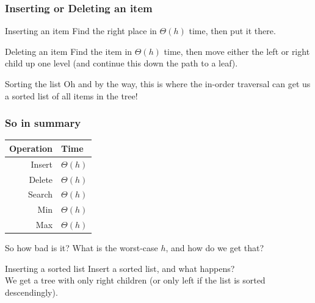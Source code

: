 \begin{frame}
	\frametitle{Inserting or Deleting an item}

	\begin{block}{Inserting an item}
		Find the right place in $\Theta(h)$ time, then put it there.
	\end{block}	

	
	\begin{block}{Deleting an item}
		Find the item in $\Theta(h)$ time, then move either the left or right child up one level (and continue this down the
		path to a leaf).
	\end{block}	
	
		\begin{block}{Sorting the list}
			Oh and by the way, this is where the in-order traversal can get us a sorted list of all items in the tree!
		\end{block}	
\end{frame}


\begin{frame}
	\frametitle{So in summary}
	\begin{tabular}{r | l}
		Operation & Time \\
		\midrule
		Insert & $\Theta(h)$ \\
		Delete & $\Theta(h)$ \\
		Search & $\Theta(h)$ \\
		Min & $\Theta(h)$ \\
		Max & $\Theta(h)$ \\
	\end{tabular}
		
	\begin{block}{So how bad is it?}
		What is the worst-case $h$, and how do we get that?
	\end{block}
	
	\begin{block}{Inserting a sorted list}
		Insert a sorted list, and what happens? \\
		 
		We get a tree with only right children (or only left if the list is sorted descendingly).
	\end{block}
	
\end{frame}


